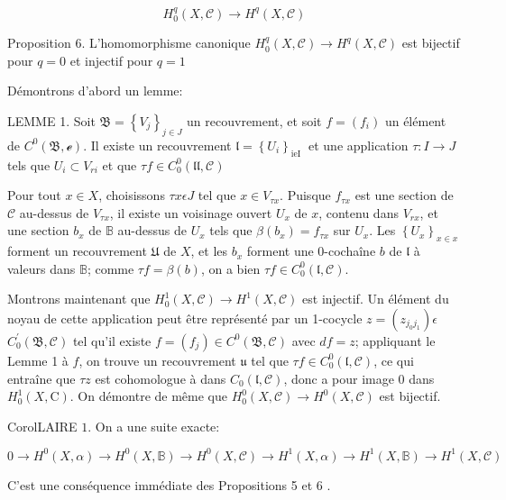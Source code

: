 $$
H_{0}^{q}(X, \mathcal{C}) \rightarrow H^{q}(X, \mathcal{C})
$$

Proposition 6. L'homomorphisme canonique $H_{0}^{q}(X, \mathcal{C}) \rightarrow H^{q}(X, \mathcal{C})$ est bijectif pour $q=0$ et injectif pour $q=1$

Démontrons d'abord un lemme:

LEMME 1. Soit $\mathfrak{B}=\left\{V_{j}\right\}_{j \in J}$ un recouvrement, et soit $f=\left(f_{i}\right)$ un élément de $C^{0}(\mathfrak{B}, \mathcal{e}) .$ Il existe un recouvrement $\mathfrak{l}=\left\{U_{i}\right\}_{\text {ieI }}$ et une application $\tau: I \rightarrow J$ tels que $U_{i} \subset V_{r i}$ et que $\tau f \in C_{0}^{0}(\mathfrak{l l}, \mathcal{C})$

Pour tout $x \in X$, choisissons $\tau x \epsilon J$ tel que $x \in V_{\tau x} .$ Puisque $f_{\tau x}$ est une section de $\mathcal{C}$ au-dessus de $V_{\tau x}$, il existe un voisinage ouvert $U_{x}$ de $x$, contenu dans $V_{r x}$, et une section $b_{x}$ de $\mathbb{B}$ au-dessus de $U_{x}$ tels que $\beta\left(b_{x}\right)=f_{\tau x}$ sur $U_{x} .$ Les $\left\{U_{x}\right\}_{x \in x}$ forment un recouvrement $\mathfrak{U}$ de $X$, et les $b_{x}$ forment une 0-cochaîne $b$ de $\mathfrak{l}$ à valeurs dans $\mathbb{B}$; comme $\tau f=\beta(b)$, on a bien $\tau f \in C_{0}^{0}(\mathfrak{l}, \mathcal{C}) .$

Montrons maintenant que $H_{0}^{1}(X, \mathcal{C}) \rightarrow H^{1}(X, \mathcal{C})$ est injectif. Un élément du noyau de cette application peut être représenté par un 1-cocycle $z=\left(z_{j_{0} j_{1}}\right) \epsilon$ $C_{0}^{\prime}(\mathfrak{B}, \mathcal{C})$ tel qu'il existe $f=\left(f_{j}\right) \in C^{0}(\mathfrak{B}, \mathcal{C})$ avec $d f=z$; appliquant le Lemme 1 à $f$, on trouve un recouvrement $\mathfrak{u}$ tel que $\tau f \in C_{0}^{0}(\mathfrak{l}, \mathcal{C})$, ce qui entraîne que $\tau z$ est cohomologue à dans $C_{0}(\mathfrak{l}, \mathcal{C})$, donc a pour image 0 dans $H_{0}^{1}(X, \mathrm{C}) .$ On démontre de même que $H_{0}^{0}(X, \mathcal{C}) \rightarrow H^{0}(X, \mathcal{C})$ est bijectif.

CorolLAIRE $1 .$ On a une suite exacte:

$$
0 \rightarrow H^{0}(X, \alpha) \rightarrow H^{0}(X, \mathbb{B}) \rightarrow H^{0}(X, \mathcal{C}) \rightarrow H^{1}(X, \alpha) \rightarrow H^{1}(X, \mathbb{B}) \rightarrow H^{1}(X, \mathcal{C})
$$

C'est une conséquence immédiate des Propositions 5 et 6 .

